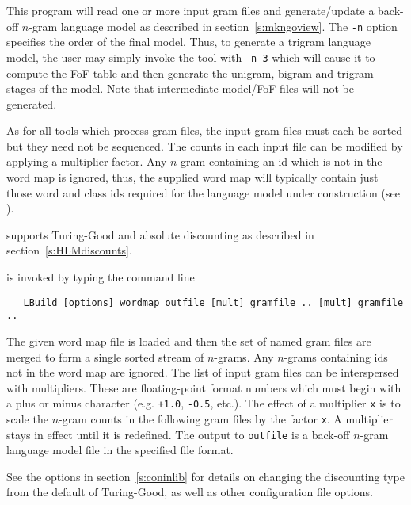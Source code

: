 %
%
%

\newpage
{}



This program will read one or more input gram files and
generate/update a back-off $n$-gram language model as described in
section~\ref{s:mkngoview}. The \texttt{-n} option specifies the order of
the final model. Thus, to generate a trigram language model, the user
may simply invoke the tool with \texttt{-n 3} which will cause it to
compute the FoF table and then generate the unigram, bigram and
trigram stages of the model. Note that intermediate model/FoF files
will not be generated.

As for all tools which process gram files, the input gram files must
each be sorted but they need not be sequenced. The counts in each
input file can be modified by applying a multiplier factor. Any $n$-gram
containing an id which is not in the word map is ignored, thus, the
supplied word map will typically contain just those word and class ids
required for the language model under construction (see
).

 supports Turing-Good and absolute discounting 
as described in section~\ref{s:HLMdiscounts}.


 is invoked by typing the command line
\begin{verbatim}
   LBuild [options] wordmap outfile [mult] gramfile .. [mult] gramfile ..
\end{verbatim}

The given word map file is loaded and then the set of named gram files
are merged to form a single sorted stream of $n$-grams. Any $n$-grams
containing ids not in the word map are ignored.  The list of input
gram files can be interspersed with multipliers. These are
floating-point format numbers which must begin with a plus or minus
character (e.g. \texttt{+1.0}, \texttt{-0.5}, etc.). The effect of a
multiplier \texttt{x} is to scale the $n$-gram counts in the following
gram files by the factor \texttt{x}. A multiplier stays in effect
until it is redefined. The output to \texttt{outfile} is a back-off
$n$-gram language model file in the specified file format.

See the  options in section~\ref{s:coninlib} for
details on changing the discounting type from the default of
Turing-Good, as well as other configuration file options.

